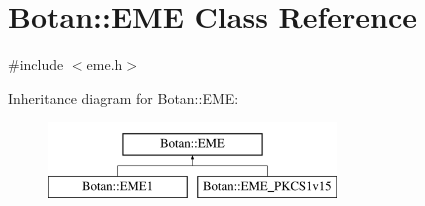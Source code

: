 \hypertarget{classBotan_1_1EME}{\section{Botan\-:\-:E\-M\-E Class Reference}
\label{classBotan_1_1EME}
}


{\ttfamily \#include $<$eme.\-h$>$}

Inheritance diagram for Botan\-:\-:E\-M\-E\-:\begin{figure}[H]
\begin{center}
\leavevmode
\includegraphics[height=2.000000cm]{classBotan_1_1EME}
\end{center}
\end{figure}
